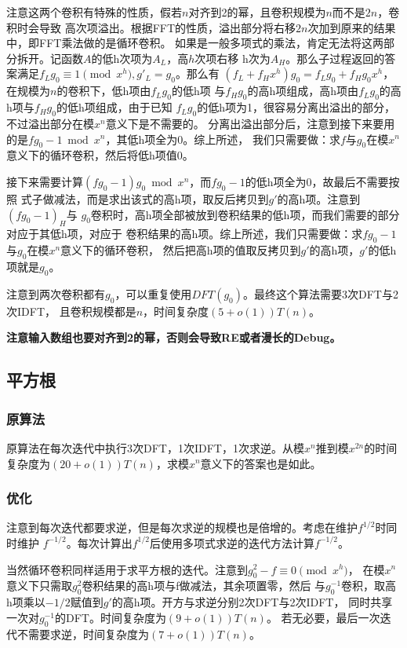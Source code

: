 注意这两个卷积有特殊的性质，假若$n$对齐到2的幂，且卷积规模为$n$而不是$2n$，卷积时会导致
高次项溢出。根据FFT的性质，溢出部分将右移$2n$次加到原来的结果中，即FFT乘法做的是循环卷积。
如果是一般多项式的乘法，肯定无法将这两部分拆开。记函数$A$的低h次项为$A_L$，高$h$次项右移
h次为$A_H$。那么子过程返回的答案满足$f_Lg_0\equiv 1\pmod{x^h},g'_L=g_0$。那么有
$(f_L+f_Hx^h)g_0=f_Lg_0+f_Hg_0x^h$，在规模为$n$的卷积下，低h项由$f_Lg_0$的低h项
与$f_Hg_0$的高h项组成，高h项由$f_Lg_0$的高h项与$f_Hg_0$的低h项组成，由于已知
$f_Lg_0$的低h项为1，很容易分离出溢出的部分，不过溢出部分在模$x^n$意义下是不需要的。
分离出溢出部分后，注意到接下来要用的是$fg_0-1 \bmod{x^n}$，其低h项全为0。综上所述，
我们只需要做：求$f$与$g_0$在模$x^n$意义下的循环卷积，然后将低h项值0。

接下来需要计算$(fg_0-1)g_0\bmod{x^n}$，而$fg_0-1$的低h项全为0，故最后不需要按照
式子做减法，而是求出该式的高h项，取反后拷贝到$g'$的高h项。注意到$(fg_0-1)_H$与
$g_0$卷积时，高h项全部被放到卷积结果的低h项，而我们需要的部分对应于其低h项，对应于
卷积结果的高h项。综上所述，我们只需要做：求$fg_0-1$与$g_0$在模$x^n$意义下的循环卷积，
然后把高h项的值取反拷贝到$g'$的高h项，$g'$的低h项就是$g_0$。

注意到两次卷积都有$g_0$，可以重复使用$DFT(g_0)$。最终这个算法需要3次DFT与2次IDFT，
且卷积规模都是$n$，时间复杂度$(5+o(1))T(n)$。

{\bfseries 注意输入数组也要对齐到2的幂，否则会导致RE或者漫长的Debug。}
\subsection{平方根}
\subsubsection{原算法}
原算法在每次迭代中执行3次DFT，1次IDFT，1次求逆。从模$x^n$推到模$x^{2n}$的时间
复杂度为$(20+o(1))T(n)$，求模$x^n$意义下的答案也是如此。
\subsubsection{优化}
注意到每次迭代都要求逆，但是每次求逆的规模也是倍增的。考虑在维护$f^{1/2}$时同时维护
$f^{-1/2}$。每次计算出$f^{1/2}$后使用多项式求逆的迭代方法计算$f^{-1/2}$。

当然循环卷积同样适用于求平方根的迭代。注意到$g_0^2-f\equiv 0 \pmod{x^h}$，
在模$x^n$意义下只需取$g_0^2$卷积结果的高h项与f做减法，其余项置零，然后
与$g^{-1}_0$卷积，取高h项乘以$-1/2$赋值到$g'$的高h项。开方与求逆分别2次DFT与2次IDFT，
同时共享一次对$g_0^{-1}$的DFT。时间复杂度为$(9+o(1))T(n)$。
若无必要，最后一次迭代不需要求逆，时间复杂度为$(7+o(1))T(n)$。
